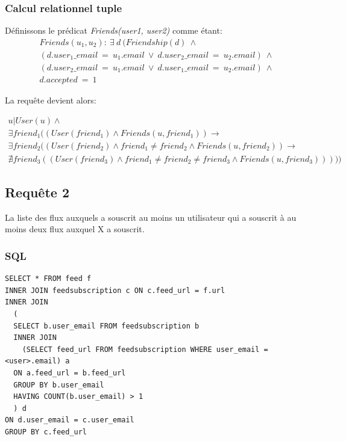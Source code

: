 \documentclass[a4paper,10pt]{article}
\begin{document}
\subsubsection{Calcul relationnel tuple}
Définissons le prédicat \emph{Friends(user1, user2)} comme étant:
\begin{equation*}
\begin{split}
Friends(u_1, u_2):\ \exists\ d\ (Friendship(d)\ \wedge \\
(d.user_1\_email\ =\ u_1.email\ \vee\ d.user_2\_email\ =\ u_2.email)\ \wedge \\
(d.user_2\_email\ =\ u_1.email\ \vee\ d.user_1\_email\ =\ u_2.email)\ \wedge \\
d.accepted\ =\ 1 
\end{split}
\end{equation*}
  
La requête devient alors:

\begin{equation*}
\begin{split}
u | User(u) \wedge \\
\exists friend_1 ((User(friend_1) \wedge Friends(u, friend_1)) \rightarrow \\
\exists friend_2 ((User(friend_2) \wedge friend_1 \neq friend_2 \wedge Friends(u, friend_2)) \rightarrow \\
\nexists friend_3 ((User(friend_3) \wedge friend_1 \neq friend_2 \neq friend_3 \wedge Friends(u, friend_3)))))
\end{split}
\end{equation*}
\clearpage
\subsection{Requête 2}
La liste des flux auxquels a souscrit au moins un utilisateur qui a souscrit à au moins deux flux auxquel X
a souscrit.
\subsubsection{SQL}
\begin{lstlisting}
SELECT * FROM feed f
INNER JOIN feedsubscription c ON c.feed_url = f.url
INNER JOIN 
  (
  SELECT b.user_email FROM feedsubscription b 
  INNER JOIN 
    (SELECT feed_url FROM feedsubscription WHERE user_email = <user>.email) a
  ON a.feed_url = b.feed_url 
  GROUP BY b.user_email
  HAVING COUNT(b.user_email) > 1
  ) d
ON d.user_email = c.user_email
GROUP BY c.feed_url
\end{lstlisting}
\end{document}
